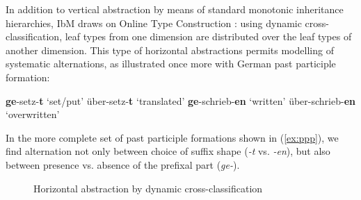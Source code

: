 In addition to vertical abstraction by means of standard monotonic
inheritance hierarchies, IbM draws on Online Type Construction
\citep{Koenig94}: using dynamic cross-classification, leaf types from
one dimension are distributed over the leaf types of another
dimension. This type of horizontal abstractions permits modelling of
systematic alternations, as illustrated once more with German past
participle formation:

\begin{exe}
  \ex \label{ex:ppp}
  \begin{xlist}

    \ex \textbf{ge}-setz-\textbf{t} `set/put'
    \ex über-setz-\textbf{t} `translated'
    \ex \textbf{ge}-schrieb-\textbf{en} `written'
    \ex über-schrieb-\textbf{en} `overwritten'
  \end{xlist}
\end{exe}

In the more complete set of past participle formations shown in
(\ref{ex:ppp}), we find alternation not only between choice of suffix
shape (\textit{-t} vs. \textit{-en}), but also between presence
vs. absence of the prefixal part (\textit{ge-}).

\begin{figure}
  \centering
  \begin{tree}
    \footnotesize
    \avmhskip{.5em}
     {
    }
  \end{tree}
  
  \caption{Horizontal abstraction by dynamic cross-classification }
  \label{fig:Horizontal}
    
\end{figure}

